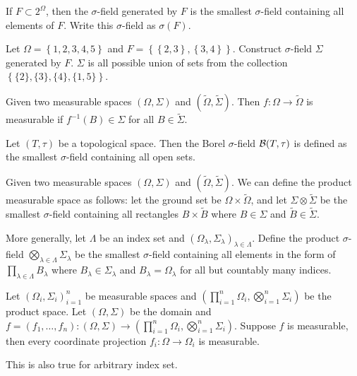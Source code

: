 \documentclass[a4paper]{article}
\begin{document}
\begin{defi}
If $F \subset 2^\Omega$, then the $\sigma$-field generated by $F$ is the
smallest $\sigma$-field containing all elements of $F$.
Write this $\sigma$-field as $\sigma (F)$.
\end{defi}

\begin{eg}
Let $\Omega = \left\{ 1, 2, 3, 4, 5 \right\}$ and
$F = \left\{ \left\{ 2,3 \right\}, \left\{ 3,4 \right\} \right\}$.
Construct $\sigma$-field $\Sigma$ generated by $F$.
$\Sigma$ is all possible union of sets from the collection
$\left\{ \{2\}, \{3\}, \{4\}, \{1, 5\}\right\}$.

\end{eg}

\begin{defi}
Given two measurable spaces $(\Omega, \Sigma)$ and $(\tilde{\Omega},
\tilde{\Sigma})$. Then $f : \Omega \to \tilde{\Omega}$ is measurable
if $f^{-1} (B) \in \Sigma$ for all $B \in \tilde{\Sigma}$.
\end{defi}

\begin{defi}
Let $(T, \tau)$ be a topological space. Then the Borel $\sigma$-field
$\mathcal{B}(T, \tau)$ is defined as the smallest $\sigma$-field containing
all open sets.
\end{defi}

\begin{defi}
Given two measurable spaces $(\Omega, \Sigma)$ and
$(\tilde{\Omega}, \tilde{\Sigma})$. We can define the product
measurable space as follows: let the ground set be
$\Omega \times \tilde{\Omega}$, and let
$\Sigma \otimes \tilde{\Sigma}$ be the smallest $\sigma$-field
containing all rectangles $B \times \tilde{B}$ where
$B \in \Sigma$ and $\tilde{B} \in \tilde{\Sigma}$.

More generally,
let $\Lambda$ be an index set and $(\Omega_\lambda, \Sigma_\lambda)_{\lambda
\in \Lambda}$. Define the product $\sigma$-field $\bigotimes_{\lambda
\in \Lambda} \Sigma_\lambda$ be
the smallest $\sigma$-field containing all elements
in the form of $\prod_{\lambda \in \Lambda} B_\lambda$ where
$B_\lambda \in \Sigma_\lambda$ and $B_\lambda = \Omega_\lambda$ for all
but countably many indices.
\end{defi}

\begin{prop}
  Let $\left( \Omega_i, \Sigma_i \right)_{i=1}^n$ be measurable
  spaces and $\left( \prod_{i=1}^n \Omega_i, \bigotimes_{i=1}^n \Sigma_i
   \right)$ be the product space. Let $(\Omega, \Sigma)$ be the domain
  and $f = (f_1, \dots, f_n) : (\Omega, \Sigma) \to (\prod_{i=1}^n
  \Omega_i, \bigotimes_{i=1}^n \Sigma_i)$. Suppose $f$ is measurable,
  then every coordinate projection $f_i : \Omega \to \Omega_i$ is
  measurable.

  This is also true for arbitrary index set.
\end{prop}
\end{document}
